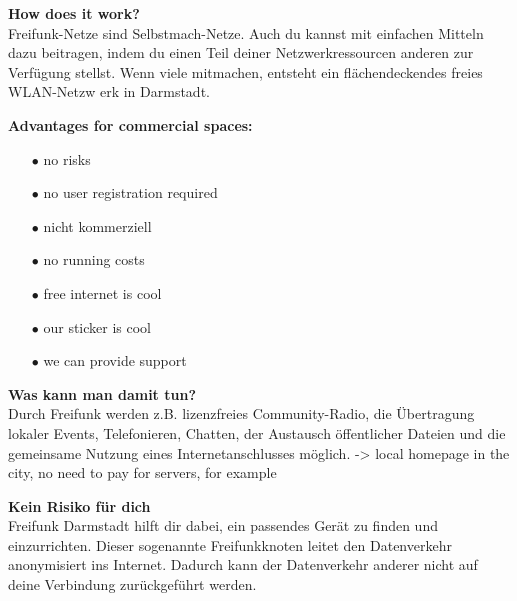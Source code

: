 \documentclass[a4paper]{article}
\begin{document}
\begin{Row}
    \begin{Cell}{1}
    \textbf{How does it work?} \\
Freifunk-Netze sind Selbstmach-Netze. Auch du kannst mit einfachen Mitteln dazu
 beitragen, indem du einen Teil deiner Netzwerkressourcen anderen zur Verfügung
 stellst. Wenn viele mitmachen, entsteht ein flächendeckendes freies WLAN-Netzw
erk in Darmstadt.
    \end{Cell}
    \begin{Cell}{1}    
    \textbf{Advantages for commercial spaces:} \vspace*{-0.18cm}
	\begin{itemize}
	   \item[\textcolor{freifunkpink}{\Large$\bullet$}] no risks \vspace*{-0.3cm}
	   \item[\textcolor{freifunkpink}{\Large$\bullet$}] no user registration required \vspace*{-0.3cm}
	   \item[\textcolor{freifunkpink}{\Large$\bullet$}] nicht kommerziell \vspace*{-0.3cm}
	   \item[\textcolor{freifunkpink}{\Large$\bullet$}] no running costs \vspace*{-0.3cm}
	   \item[\textcolor{freifunkpink}{\Large$\bullet$}] free internet is cool\vspace*{-0.3cm}
	   \item[\textcolor{freifunkpink}{\Large$\bullet$}] our sticker is cool\vspace*{-0.3cm}
	   \item[\textcolor{freifunkpink}{\Large$\bullet$}] we can provide support
	\end{itemize}
    \end{Cell}
\end{Row}
\newpage

\thispagestyle{empty}

\begin{Row}[cellsep=0.75cm]
    \begin{Cell}{1}
    \textbf{Was kann man damit tun?} \\
    Durch Freifunk werden z.B. lizenzfreies Community-Radio, die Übertragung lokaler Events, Telefonieren, Chatten, der Austausch öffentlicher Dateien und die gemeinsame Nutzung eines Internetanschlusses möglich. -> local homepage in the city, no need to pay for servers, for example
    \end{Cell} 
\begin{Cell}{1}
    \textbf{Kein Risiko für dich} \\
Freifunk Darmstadt hilft dir dabei, ein passendes Gerät zu finden und einzurrichten. Dieser sogenannte Freifunkknoten leitet den Datenverkehr anonymisiert ins Internet. Dadurch kann der Datenverkehr anderer nicht auf deine Verbindung zurückgeführt werden.
\end{Cell}
\end{Row}
\end{document}
